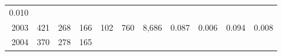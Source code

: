 \documentclass[]{article}
\begin{document}
\begin{longtable}[]{@{}rrrrrrrrrrr@{}}
\begin{minipage}[t]{0.04\columnwidth}
0.010\strut
\end{minipage}\tabularnewline
\begin{minipage}[t]{0.06\columnwidth}\raggedleft\strut
2003\strut
\end{minipage} & \begin{minipage}[t]{0.07\columnwidth}\raggedleft\strut
421\strut
\end{minipage} & \begin{minipage}[t]{0.07\columnwidth}\raggedleft\strut
268\strut
\end{minipage} & \begin{minipage}[t]{0.07\columnwidth}\raggedleft\strut
166\strut
\end{minipage} & \begin{minipage}[t]{0.07\columnwidth}\raggedleft\strut
102\strut
\end{minipage} & \begin{minipage}[t]{0.07\columnwidth}\raggedleft\strut
760\strut
\end{minipage} & \begin{minipage}[t]{0.05\columnwidth}\raggedleft\strut
8,686\strut
\end{minipage} & \begin{minipage}[t]{0.09\columnwidth}\raggedleft\strut
0.087\strut
\end{minipage} & \begin{minipage}[t]{0.05\columnwidth}\raggedleft\strut
0.006\strut
\end{minipage} & \begin{minipage}[t]{0.10\columnwidth}\raggedleft\strut
0.094\strut
\end{minipage} & \begin{minipage}[t]{0.04\columnwidth}\raggedleft\strut
0.008\strut
\end{minipage}\tabularnewline
\begin{minipage}[t]{0.06\columnwidth}\raggedleft\strut
2004\strut
\end{minipage} & \begin{minipage}[t]{0.07\columnwidth}\raggedleft\strut
370\strut
\end{minipage} & \begin{minipage}[t]{0.07\columnwidth}\raggedleft\strut
278\strut
\end{minipage} & \begin{minipage}[t]{0.07\columnwidth}\raggedleft\strut
165\strut
\end{minipage} & \begin{minipage}[t]{0.07\columnwidth}\raggedleft\strut

\end{minipage}
\end{longtable}
\end{document}

